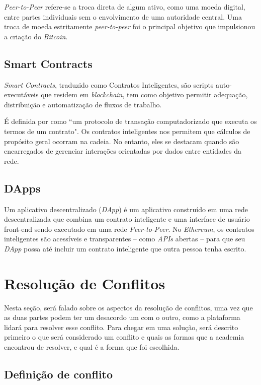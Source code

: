 \textit{Peer-to-Peer} refere-se a troca direta de algum ativo, como uma moeda digital, entre partes individuais sem o envolvimento de uma autoridade central. Uma troca de moeda estritamente \textit{peer-to-peer} foi o principal objetivo que impulsionou a criação do \textit{Bitcoin}. \cite{peer-to-peer}

\subsection{Smart Contracts}

\textit{Smart Contracts}, traduzido como Contratos Inteligentes, são scripts auto-executáveis que residem em \textit{blockchain}, tem como objetivo permitir adequação, distribuição e automatização de fluxos de trabalho. \cite{smart_contract2}

É definida por \citeauthor{smart_contract} como “um protocolo de transação computadorizado que executa os termos de um contrato". Os contratos inteligentes nos permitem que cálculos de propósito geral ocorram na cadeia. No entanto, eles se destacam quando são encarregados de gerenciar interações orientadas por dados entre entidades da rede.

\subsection{DApps}

Um aplicativo descentralizado (\textit{DApp}) é um aplicativo construído em uma rede descentralizada que combina um contrato inteligente e uma interface de usuário front-end sendo executado em uma rede \textit{Peer-to-Peer}. No \textit{Ethereum}, os contratos inteligentes são acessíveis e transparentes – como \textit{APIs} abertas – para que seu \textit{DApp} possa até incluir um contrato inteligente que outra pessoa tenha escrito.\cite{DApps}

\section{Resolução de Conflitos}

Nesta seção, será falado sobre os aspectos da resolução de conflitos, uma vez que as duas partes podem ter um desacordo um com o outro, como a plataforma lidará para resolver esse conflito. Para chegar em uma solução, será descrito primeiro o que será considerado um conflito e quais as formas que a academia encontrou de resolver, e qual é a forma que foi escolhida.

\subsection{Definição de conflito}

